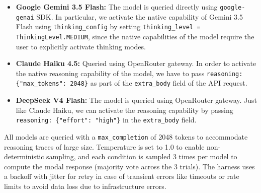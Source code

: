 \documentclass{article}
\begin{document}
\begin{itemize}
    \item \textbf{Google Gemini 3.5 Flash:} The model is queried directly using \texttt{google-genai} SDK. In particular, we activate the native capability of Gemini 3.5 Flash using \texttt{thinking\_config} by setting \texttt{thinking\_level = ThinkingLevel.MEDIUM}, since the native capabilities of the model require the user to explicitly activate thinking modes.
    \item \textbf{Claude Haiku 4.5:} Queried using OpenRouter gateway. In order to activate the native reasoning capability of the model, we have to pass \texttt{reasoning: \{"max\_tokens": 2048\}} as part of the \texttt{extra\_body} field of the API request.
    \item \textbf{DeepSeek V4 Flash:} The model is queried using OpenRouter gateway. Just like Claude Haiku, we can activate the reasoning capability by passing \texttt{reasoning: \{"effort": "high"\}} in the \texttt{extra\_body} field.
\end{itemize}

All models are queried with a \texttt{max\_completion} of 2048 tokens to accommodate reasoning traces of large size. Temperature is set to 1.0 to enable non-deterministic sampling, and each condition is sampled 3 times per model to compute the modal response (majority vote across the 3 trials). The harness uses a backoff with jitter for retry in case of transient errors like timeouts or rate limits to avoid data loss due to infrastructure errors.
\end{document}
